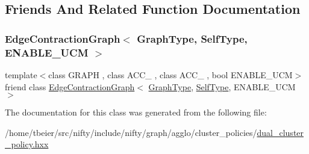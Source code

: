 \subsection{Friends And Related Function Documentation}
\mbox{\label{classnifty_1_1graph_1_1agglo_1_1DualClusterPolicy_a6939aa4c6113ba9c44fd5e048687ba92}} 
\subsubsection{\texorpdfstring{Edge\+Contraction\+Graph$<$ Graph\+Type, Self\+Type, E\+N\+A\+B\+L\+E\+\_\+\+U\+C\+M $>$}{EdgeContractionGraph< GraphType, SelfType, ENABLE\_UCM >}}
{\footnotesize\ttfamily template$<$class G\+R\+A\+PH , class A\+C\+C\+\_ , class A\+C\+C\+\_ , bool E\+N\+A\+B\+L\+E\+\_\+\+U\+CM$>$ \\
friend class \hyperlink{classnifty_1_1graph_1_1EdgeContractionGraph}{Edge\+Contraction\+Graph}$<$ \hyperlink{classnifty_1_1graph_1_1agglo_1_1DualClusterPolicy_ad8e19fe87ad08f4187fdb79c1367389a}{Graph\+Type}, \hyperlink{classnifty_1_1graph_1_1agglo_1_1DualClusterPolicy}{Self\+Type}, E\+N\+A\+B\+L\+E\+\_\+\+U\+CM $>$\hspace{0.3cm}{\ttfamily [friend]}}



The documentation for this class was generated from the following file\+:\begin{DoxyCompactItemize}
\item 
/home/tbeier/src/nifty/include/nifty/graph/agglo/cluster\+\_\+policies/\hyperlink{dual__cluster__policy_8hxx}{dual\+\_\+cluster\+\_\+policy.\+hxx}\end{DoxyCompactItemize}

